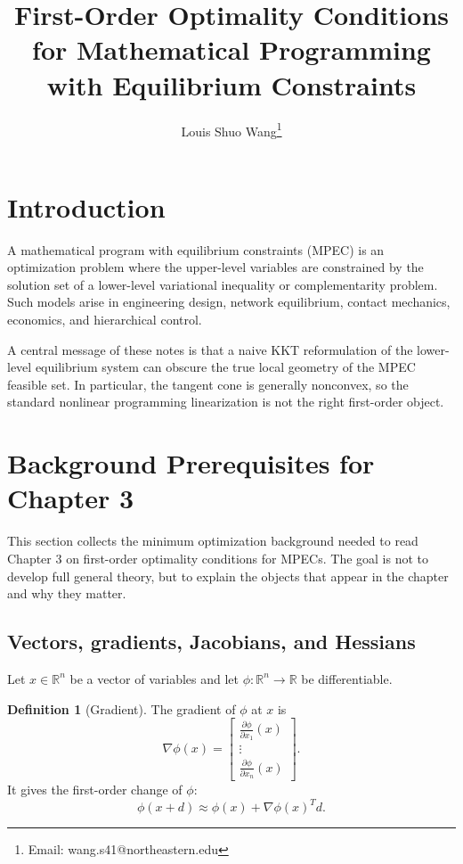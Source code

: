 \documentclass[pdflatex,sn-mathphys-num]{sn-jnl}%
\title{First-Order Optimality Conditions for Mathematical Programming with Equilibrium Constraints}
\author{Louis Shuo Wang\thanks{Email: wang.s41@northeastern.edu}}
\affil{Department of Mathematics, Northeastern University, Boston, 02115, MA, USA}
\theoremstyle{definition}
\newtheorem{definition}[theorem]{Definition}
\begin{document}
\maketitle

\section{Introduction}

A mathematical program with equilibrium constraints (MPEC) is an
optimization problem where the upper-level variables are constrained by the
solution set of a lower-level variational inequality or complementarity
problem. Such models arise in engineering design, network equilibrium,
contact mechanics, economics, and hierarchical control.

A central message of these notes is that a naive KKT reformulation of the
lower-level equilibrium system can obscure the true local geometry of the
MPEC feasible set. In particular, the tangent cone is generally nonconvex,
so the standard nonlinear programming linearization is not the right
first-order object.

\section{Background Prerequisites for Chapter 3}

This section collects the minimum optimization background needed to read
Chapter 3 on first-order optimality conditions for MPECs. The goal is not
to develop full general theory, but to explain the objects that appear in
the chapter and why they matter.

\subsection{Vectors, gradients, Jacobians, and Hessians}

Let $x\in\mathbb{R}^n$ be a vector of variables and let
$\phi:\mathbb{R}^n\to\mathbb{R}$ be differentiable.

\begin{definition}[Gradient]
The gradient of $\phi$ at $x$ is
\[
\nabla \phi(x)
=
\begin{bmatrix}
\frac{\partial \phi}{\partial x_1}(x)\\
\vdots\\
\frac{\partial \phi}{\partial x_n}(x)
\end{bmatrix}.
\]
It gives the first-order change of $\phi$:
\[
\phi(x+d)\approx \phi(x)+\nabla\phi(x)^T d.
\]
\end{definition}
\end{document}
